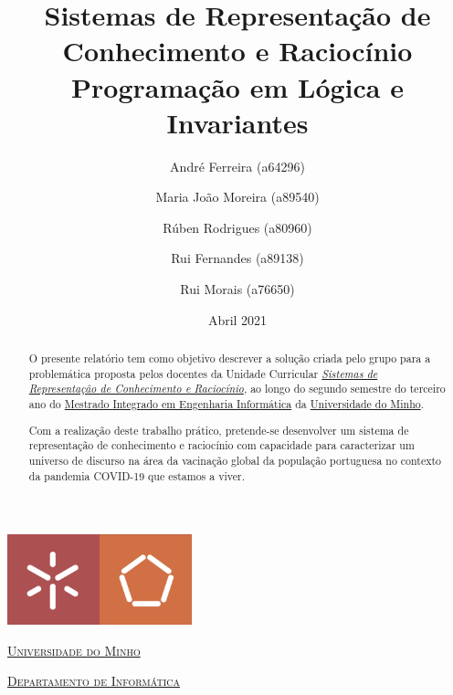 \documentclass[a4paper, 11pt]{article}
\title{Sistemas de Representação de \\ Conhecimento e Raciocínio\\ [0.8em] \smaller{}Programação em Lógica e Invariantes}
\author{André Ferreira (a64296) \and Maria João Moreira (a89540) \and Rúben Rodrigues (a80960) \and Rui Fernandes (a89138)
\and Rui Morais (a76650)}
\date{Abril 2021}
\begin{document}
\begin{titlepage}
    \begin{center}
        \begin{minipage}{0.75\linewidth}
            \centering
            \includegraphics[width=0.4\textwidth]{img/EEUM.png}\par\vspace{1cm}
            \vspace{1.5cm}
            \href{https://www.uminho.pt/PT}{\scshape\LARGE Universidade do Minho} \par
            \vspace{1cm}
            \href{https://www.di.uminho.pt/}{\scshape\Large Departamento de Informática} \par
            \vspace{1.5cm}
            \maketitle
        \end{minipage}
    \end{center}
    \vspace{2cm}
    \thispagestyle{empty}
    \clearpage
\end{titlepage}


\begin{abstract}
O presente relatório tem como objetivo descrever a solução criada pelo grupo para a problemática proposta pelos docentes
da Unidade Curricular \href{https://miei.di.uminho.pt/plano_estudos.html#sistemas_de_representa_o_de_conhecimento_e_racioc_nio}
{\emph{Sistemas de Representação de Conhecimento e Raciocínio}}, ao longo do segundo semestre do terceiro ano do
\href{http://miei.di.uminho.pt}{Mestrado Integrado em Engenharia Informática} da \href{https://www.uminho.pt}{Universidade
do Minho}.

Com a realização deste trabalho prático, pretende-se desenvolver um sistema de representação de conhecimento e raciocínio
com capacidade para caracterizar um universo de discurso na área da vacinação global da população portuguesa no contexto
da pandemia COVID-19 que estamos a viver.
\end{abstract}
\end{document}
